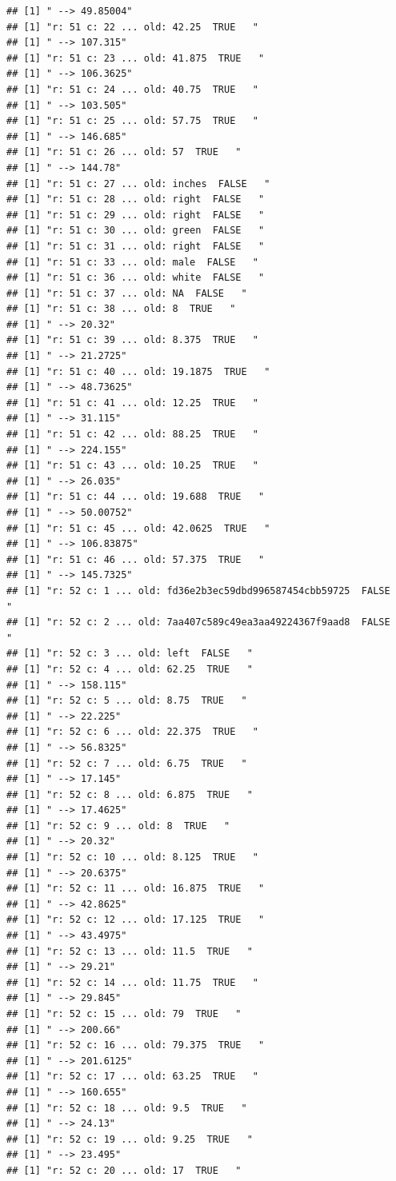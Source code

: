 \documentclass[]{article}
\begin{document}
\begin{verbatim}
## [1] " --> 49.85004"
## [1] "r: 51 c: 22 ... old: 42.25  TRUE   "
## [1] " --> 107.315"
## [1] "r: 51 c: 23 ... old: 41.875  TRUE   "
## [1] " --> 106.3625"
## [1] "r: 51 c: 24 ... old: 40.75  TRUE   "
## [1] " --> 103.505"
## [1] "r: 51 c: 25 ... old: 57.75  TRUE   "
## [1] " --> 146.685"
## [1] "r: 51 c: 26 ... old: 57  TRUE   "
## [1] " --> 144.78"
## [1] "r: 51 c: 27 ... old: inches  FALSE   "
## [1] "r: 51 c: 28 ... old: right  FALSE   "
## [1] "r: 51 c: 29 ... old: right  FALSE   "
## [1] "r: 51 c: 30 ... old: green  FALSE   "
## [1] "r: 51 c: 31 ... old: right  FALSE   "
## [1] "r: 51 c: 33 ... old: male  FALSE   "
## [1] "r: 51 c: 36 ... old: white  FALSE   "
## [1] "r: 51 c: 37 ... old: NA  FALSE   "
## [1] "r: 51 c: 38 ... old: 8  TRUE   "
## [1] " --> 20.32"
## [1] "r: 51 c: 39 ... old: 8.375  TRUE   "
## [1] " --> 21.2725"
## [1] "r: 51 c: 40 ... old: 19.1875  TRUE   "
## [1] " --> 48.73625"
## [1] "r: 51 c: 41 ... old: 12.25  TRUE   "
## [1] " --> 31.115"
## [1] "r: 51 c: 42 ... old: 88.25  TRUE   "
## [1] " --> 224.155"
## [1] "r: 51 c: 43 ... old: 10.25  TRUE   "
## [1] " --> 26.035"
## [1] "r: 51 c: 44 ... old: 19.688  TRUE   "
## [1] " --> 50.00752"
## [1] "r: 51 c: 45 ... old: 42.0625  TRUE   "
## [1] " --> 106.83875"
## [1] "r: 51 c: 46 ... old: 57.375  TRUE   "
## [1] " --> 145.7325"
## [1] "r: 52 c: 1 ... old: fd36e2b3ec59dbd996587454cbb59725  FALSE   "
## [1] "r: 52 c: 2 ... old: 7aa407c589c49ea3aa49224367f9aad8  FALSE   "
## [1] "r: 52 c: 3 ... old: left  FALSE   "
## [1] "r: 52 c: 4 ... old: 62.25  TRUE   "
## [1] " --> 158.115"
## [1] "r: 52 c: 5 ... old: 8.75  TRUE   "
## [1] " --> 22.225"
## [1] "r: 52 c: 6 ... old: 22.375  TRUE   "
## [1] " --> 56.8325"
## [1] "r: 52 c: 7 ... old: 6.75  TRUE   "
## [1] " --> 17.145"
## [1] "r: 52 c: 8 ... old: 6.875  TRUE   "
## [1] " --> 17.4625"
## [1] "r: 52 c: 9 ... old: 8  TRUE   "
## [1] " --> 20.32"
## [1] "r: 52 c: 10 ... old: 8.125  TRUE   "
## [1] " --> 20.6375"
## [1] "r: 52 c: 11 ... old: 16.875  TRUE   "
## [1] " --> 42.8625"
## [1] "r: 52 c: 12 ... old: 17.125  TRUE   "
## [1] " --> 43.4975"
## [1] "r: 52 c: 13 ... old: 11.5  TRUE   "
## [1] " --> 29.21"
## [1] "r: 52 c: 14 ... old: 11.75  TRUE   "
## [1] " --> 29.845"
## [1] "r: 52 c: 15 ... old: 79  TRUE   "
## [1] " --> 200.66"
## [1] "r: 52 c: 16 ... old: 79.375  TRUE   "
## [1] " --> 201.6125"
## [1] "r: 52 c: 17 ... old: 63.25  TRUE   "
## [1] " --> 160.655"
## [1] "r: 52 c: 18 ... old: 9.5  TRUE   "
## [1] " --> 24.13"
## [1] "r: 52 c: 19 ... old: 9.25  TRUE   "
## [1] " --> 23.495"
## [1] "r: 52 c: 20 ... old: 17  TRUE   "

\end{verbatim}
\end{document}
